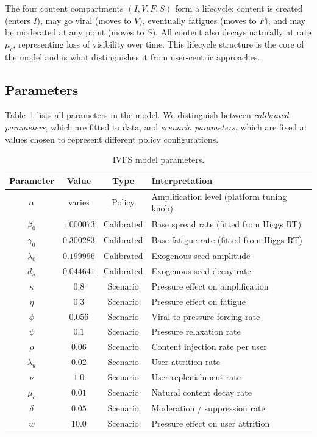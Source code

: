 \documentclass[11pt]{article}
\begin{document}
The four content compartments $(I, V, F, S)$ form a lifecycle: content is created (enters $I$), may go viral (moves to $V$), eventually fatigues (moves to $F$), and may be moderated at any point (moves to $S$). All content also decays naturally at rate $\mu_c$, representing loss of visibility over time. This lifecycle structure is the core of the model and is what distinguishes it from user-centric approaches.

\subsection{Parameters}

Table~\ref{tab:params} lists all parameters in the model. We distinguish between \emph{calibrated parameters}, which are fitted to data, and \emph{scenario parameters}, which are fixed at values chosen to represent different policy configurations.

\begin{table}[H]
\centering
\caption{IVFS model parameters.}
\label{tab:params}
\begin{tabular}{cccl}
\toprule
Parameter & Value & Type & Interpretation \\
\midrule
$\alpha$ & varies & Policy & Amplification level (platform tuning knob) \\
$\beta_0$ & $1.000073$ & Calibrated & Base spread rate (fitted from Higgs RT) \\
$\gamma_0$ & $0.300283$ & Calibrated & Base fatigue rate (fitted from Higgs RT) \\
$\lambda_0$ & $0.199996$ & Calibrated & Exogenous seed amplitude \\
$d_\lambda$ & $0.044641$ & Calibrated & Exogenous seed decay rate \\
$\kappa$ & $0.8$ & Scenario & Pressure effect on amplification \\
$\eta$ & $0.3$ & Scenario & Pressure effect on fatigue \\
$\phi$ & $0.056$ & Scenario & Viral-to-pressure forcing rate \\
$\psi$ & $0.1$ & Scenario & Pressure relaxation rate \\
$\rho$ & $0.06$ & Scenario & Content injection rate per user \\
$\lambda_u$ & $0.02$ & Scenario & User attrition rate \\
$\nu$ & $1.0$ & Scenario & User replenishment rate \\
$\mu_c$ & $0.01$ & Scenario & Natural content decay rate \\
$\delta$ & $0.05$ & Scenario & Moderation / suppression rate \\
$w$ & $10.0$ & Scenario & Pressure effect on user attrition \\
\bottomrule
\end{tabular}
\end{table}
\end{document}
